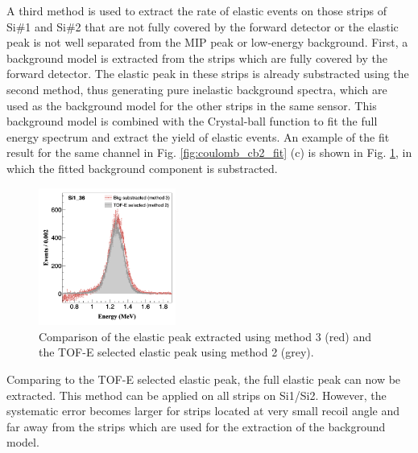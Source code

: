 \documentclass[fleqn,twocolumn,a4paper]{ikpar}
\begin{document}
\par
\medskip

A third method is used to extract the rate of elastic events on those strips of
Si\#1 and Si\#2 that are not fully covered by the forward detector or the
elastic peak is not well separated from the MIP peak or low-energy background.
First, a background model is extracted from the strips which are fully covered by the forward detector.
The elastic peak in these strips is already substracted using the second method, thus generating 
pure inelastic background spectra, which are used as the background model
for the other strips in the same sensor.
This background model is combined with the Crystal-ball function to fit the full
energy spectrum and extract the yield of elastic events.
An example of the fit result for the same channel in Fig. \ref{fig:coulomb_cb2_fit}
(c) is shown in Fig. \ref{fig:bkg_vs_tofe}, in which the fitted background component is substracted. 
\begin{figure}[b!]
  \centering
	\includegraphics[width=0.4\textwidth]{./bkg_vs_tofe.png}
  \caption{Comparison of the elastic peak extracted using method 3 (red) and
    the TOF-E selected elastic peak using method 2 (grey).}
  \label{fig:bkg_vs_tofe}
\end{figure}
Comparing to the TOF-E selected elastic peak, the full elastic peak can now be extracted.
This method can be applied on all strips on Si1/Si2.
However, the systematic error becomes larger for strips located at very small
recoil angle and far away from the strips which are used for the extraction of the background model.

\par
\medskip
\end{document}
